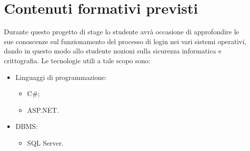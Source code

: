 \newpage
\section*{Contenuti formativi previsti}
Durante questo progetto di stage lo studente avrà occasione di approfondire le sue conoscenze sul funzionamento del processo di login nei vari sistemi operativi, dando in questo modo allo studente nozioni sulla sicurezza informatica e crittografia.
\newline Le tecnologie utili a tale scopo sono:
\begin{itemize}
	\item Linguaggi di programmazione:
	\begin{itemize}
		\item C\#;
		\item ASP.NET.
	\end{itemize}
	\item DBMS:
	\begin{itemize}
		\item SQL Server.
	\end{itemize}
\end{itemize}
\newpage